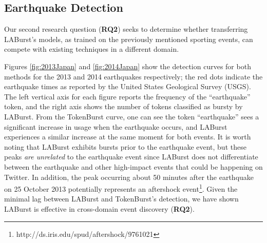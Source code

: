 \documentclass[letterpaper]{article}
\begin{document}
\subsection{Earthquake Detection}

Our second research question (\textbf{RQ2}) seeks to determine whether transferring LABurst's models, as trained on the previously mentioned sporting events, can compete with existing techniques in a different domain.

Figures \ref{fig:2013Japan} and \ref{fig:2014Japan} show the detection curves for both methods for the 2013 and 2014 earthquakes respectively; the red dots indicate the earthquake times as reported by the United States Geological Survey (USGS).
The left vertical axis for each figure reports the frequency of the ``earthquake'' token, and the right axis shows the number of tokens classified as bursty by LABurst.
From the TokenBurst curve, one can see the token ``earthquake'' sees a significant increase in usage when the earthquake occurs, and LABurst experiences a similar increase at the same moment for both events.
It is worth noting that LABurst exhibits bursts prior to the earthquake event, but these peaks \emph{are unrelated} to the earthquake event since LABurst does not differentiate between the earthquake and other high-impact events that could be happening on Twitter. 
In addition, the peak occurring about 50 minutes after the earthquake on 25 October 2013 potentially represents an aftershock event\footnote{http://ds.iris.edu/spud/aftershock/9761021}.
Given the minimal lag between LABurst and TokenBurst's detection, we have shown LABurst is effective in cross-domain event discovery (\textbf{RQ2}).
\end{document}
